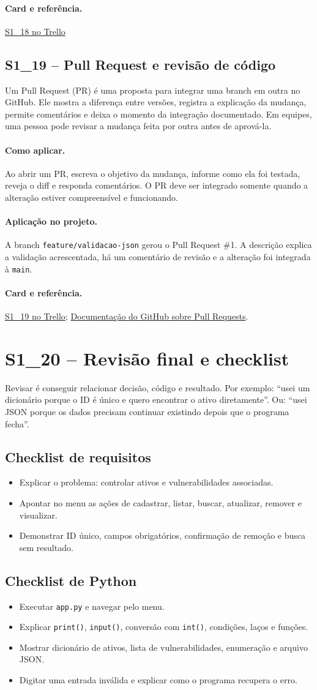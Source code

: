 \documentclass[11pt,a4paper]{article}
\newcommand{\projeto}{\paragraph{Aplicação no projeto.}}
\newcommand{\comoaplicar}{\paragraph{Como aplicar.}}
\newcommand{\referencia}[2]{\paragraph{Card e referência.}\href{#1}{#2}}
\newcommand{\cardsection}[1]{\Needspace{12\baselineskip}\subsection{#1}}
\begin{document}
\referencia{https://trello.com/c/kFfXpK39}{S1\_18 no Trello}

\cardsection{S1\_19 -- Pull Request e revisão de código}

Um Pull Request (PR) é uma proposta para integrar uma branch em outra no GitHub. Ele mostra a diferença entre versões, registra a explicação da mudança, permite comentários e deixa o momento da integração documentado. Em equipes, uma pessoa pode revisar a mudança feita por outra antes de aprová-la.

\comoaplicar
Ao abrir um PR, escreva o objetivo da mudança, informe como ela foi testada, reveja o diff e responda comentários. O PR deve ser integrado somente quando a alteração estiver compreensível e funcionando.

\projeto
A branch \texttt{feature/validacao-json} gerou o Pull Request \#1. A descrição explica a validação acrescentada, há um comentário de revisão e a alteração foi integrada à \texttt{main}.

\referencia{https://trello.com/c/tsLFX3pi}{S1\_19 no Trello}; \href{https://docs.github.com/pull-requests}{Documentação do GitHub sobre Pull Requests}.

\section{S1\_20 -- Revisão final e checklist}

Revisar é conseguir relacionar decisão, código e resultado. Por exemplo: ``usei um dicionário porque o ID é único e quero encontrar o ativo diretamente''. Ou: ``usei JSON porque os dados precisam continuar existindo depois que o programa fecha''.

\cardsection{Checklist de requisitos}
\begin{itemize}
  \item Explicar o problema: controlar ativos e vulnerabilidades associadas.
  \item Apontar no menu as ações de cadastrar, listar, buscar, atualizar, remover e visualizar.
  \item Demonstrar ID único, campos obrigatórios, confirmação de remoção e busca sem resultado.
\end{itemize}

\cardsection{Checklist de Python}
\begin{itemize}
  \item Executar \texttt{app.py} e navegar pelo menu.
  \item Explicar \texttt{print()}, \texttt{input()}, conversão com \texttt{int()}, condições, laços e funções.
  \item Mostrar dicionário de ativos, lista de vulnerabilidades, enumeração e arquivo JSON.
  \item Digitar uma entrada inválida e explicar como o programa recupera o erro.
\end{itemize}
\end{document}
